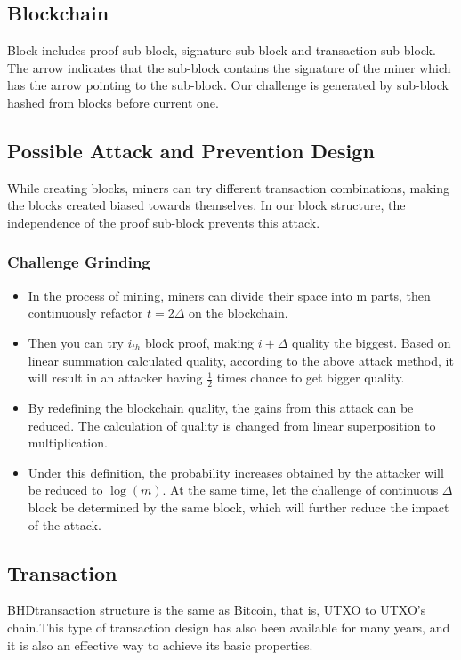 \subsection{Blockchain}
\begin{flushleft}
    Block includes proof sub block, signature sub block and transaction sub block. The arrow indicates that the sub-block contains the signature of the miner which has the arrow pointing to the sub-block. Our challenge is generated by sub-block hashed from blocks before current one.
\end{flushleft}
\subsection{Possible Attack and Prevention Design}
\begin{flushleft}
    While creating blocks, miners can try different transaction combinations, making the blocks created biased towards themselves. In our block structure, the independence of the proof sub-block prevents this attack.
\end{flushleft}
\subsubsection{Challenge Grinding}
\begin{itemize}
    \item In the process of mining, miners can divide their space into m parts, then continuously refactor $t = 2\Delta$ on the blockchain.
    \item Then you can try $i_{th}$ block proof, making $i + \Delta$ quality the biggest. Based on linear summation calculated quality, according to the above attack method, it will result in an attacker having $\frac{1}{2}$ times chance to get bigger quality.
    \item By redefining the blockchain quality, the gains from this attack can be reduced. The calculation of quality is changed from linear superposition to multiplication.
    \item Under this definition, the probability increases obtained by the attacker will be reduced to $\log(m)$. At the same time, let the challenge of continuous $\Delta$ block be determined by the same block, which will further reduce the impact of the attack.
\end{itemize}
\subsection{Transaction}
\begin{flushleft}
    BHDtransaction structure is the same as Bitcoin, that is, UTXO to UTXO's chain.This type of transaction design has also been available for many years, and it is also an effective way to achieve its basic properties.
\end{flushleft}
